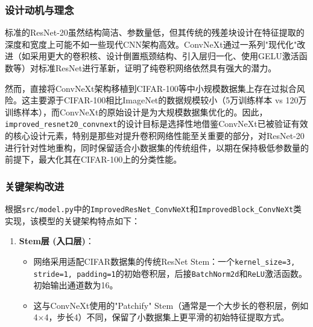 \documentclass[a4paper]{article}
\begin{document}
\begin{description}
\subsubsection{设计动机与理念}

标准的ResNet-20虽然结构简洁、参数量低，但其传统的残差块设计在特征提取的深度和宽度上可能不如一些现代CNN架构高效。ConvNeXt通过一系列"现代化"改进（如采用更大的卷积核、设计倒置瓶颈结构、引入层归一化、使用GELU激活函数等）对标准ResNet进行革新，证明了纯卷积网络依然具有强大的潜力。

然而，直接将ConvNeXt架构移植到CIFAR-100等中小规模数据集上存在过拟合风险。这主要源于CIFAR-100相比ImageNet的数据规模较小（5万训练样本 vs 120万训练样本），而ConvNeXt的原始设计是为大规模数据集优化的。因此，\texttt{improved\_resnet20\_convnext}的设计目标是选择性地借鉴ConvNeXt已被验证有效的核心设计元素，特别是那些对提升卷积网络性能至关重要的部分，对ResNet-20进行针对性地重构，同时保留适合小数据集的传统组件，以期在保持极低参数量的前提下，最大化其在CIFAR-100上的分类性能。

\subsubsection{关键架构改进}

根据\texttt{src/model.py}中的\texttt{ImprovedResNet\_ConvNeXt}和\texttt{ImprovedBlock\_ConvNeXt}类实现，该模型的关键架构特点如下：

\begin{enumerate}
    \item \textbf{Stem层 (入口层)}：
    \begin{itemize}
        \item 网络采用适配CIFAR数据集的传统ResNet Stem：一个\texttt{kernel\_size=3, stride=1, padding=1}的初始卷积层，后接\texttt{BatchNorm2d}和\texttt{ReLU}激活函数。初始输出通道数为16。
        \item 这与ConvNeXt使用的"Patchify" Stem（通常是一个大步长的卷积层，例如4×4，步长4）不同，保留了小数据集上更平滑的初始特征提取方式。
    \end{itemize}
    

\end{enumerate}
\end{description}
\end{document}
